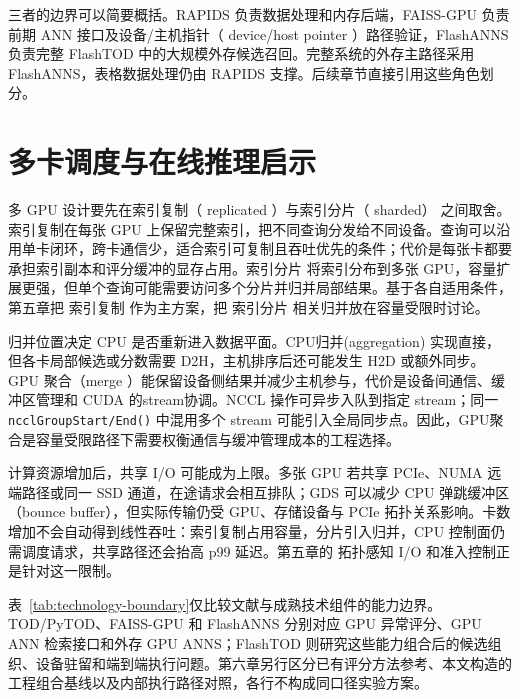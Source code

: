 三者的边界可以简要概括。RAPIDS 负责数据处理和内存后端，FAISS-GPU 负责前期 ANN 接口及设备/主机指针（ device/host pointer ）路径验证，FlashANNS 负责完整 FlashTOD 中的大规模外存候选召回。完整系统的外存主路径采用 FlashANNS，表格数据处理仍由 RAPIDS 支撑。后续章节直接引用这些角色划分。

\Needspace{0.35\textheight}
\section{多卡调度与在线推理启示}

多 GPU 设计要先在索引复制（ replicated ）与索引分片（ sharded） 之间取舍。索引复制在每张 GPU 上保留完整索引，把不同查询分发给不同设备。查询可以沿用单卡闭环，跨卡通信少，适合索引可复制且吞吐优先的条件；代价是每张卡都要承担索引副本和评分缓冲的显存占用。索引分片 将索引分布到多张 GPU，容量扩展更强，但单个查询可能需要访问多个分片并归并局部结果。基于各自适用条件，第五章把 索引复制 作为主方案，把 索引分片 相关归并放在容量受限时讨论\citep{cuvs_multi_gpu_nn,cuvs_dist_mode}。

归并位置决定 CPU 是否重新进入数据平面。CPU归并(aggregation) 实现直接，但各卡局部候选或分数需要 D2H，主机排序后还可能发生 H2D 或额外同步。GPU 聚合（merge ）能保留设备侧结果并减少主机参与，代价是设备间通信、缓冲区管理和 CUDA 的stream协调。NCCL 操作可异步入队到指定 stream；同一 \texttt{ncclGroupStart/End()} 中混用多个 stream 可能引入全局同步点\citep{nccl_stream_semantics}。因此，GPU聚合是容量受限路径下需要权衡通信与缓冲管理成本的工程选择。

计算资源增加后，共享 I/O 可能成为上限。多张 GPU 若共享 PCIe、NUMA 远端路径或同一 SSD 通道，在途请求会相互排队；GDS 可以减少 CPU 弹跳缓冲区（bounce buffer），但实际传输仍受 GPU、存储设备与 PCIe 拓扑关系影响\citep{gds_overview,gds_design_guide,li2024multigpunuma}。卡数增加不会自动得到线性吞吐：索引复制占用容量，分片引入归并，CPU 控制面仍需调度请求，共享路径还会抬高 p99 延迟。第五章的 拓扑感知 I/O 和准入控制正是针对这一限制。

表~\ref{tab:technology-boundary}仅比较文献与成熟技术组件的能力边界。TOD/PyTOD、FAISS-GPU 和 FlashANNS 分别对应 GPU 异常评分、GPU ANN 检索接口和外存 GPU ANNS；FlashTOD 则研究这些能力组合后的候选组织、设备驻留和端到端执行问题。第六章另行区分已有评分方法参考、本文构造的工程组合基线以及内部执行路径对照，各行不构成同口径实验方案。

